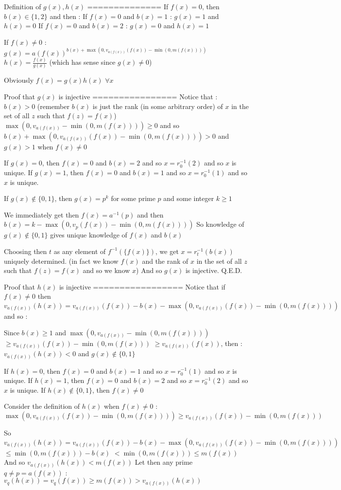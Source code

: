 \begin{solution}
Definition of $g(x),h(x)$
==============
If $f(x)=0$, then $b(x)\in\{1,2\}$ and then :
If $f(x)=0$ and $b(x)=1$ : $g(x)=1$ and $h(x)=0$
If $f(x)=0$ and $b(x)=2$ : $g(x)=0$ and $h(x)=1$

If $f(x)\ne 0$ :
$g(x)=a(f(x))^{b(x)+\max(0,v_{a(f(x))}(f(x))-\min(0,m(f(x))))}$
$h(x)=\frac{f(x)}{g(x)}$ (which has sense since $g(x)\ne 0$)

Obviously $f(x)=g(x)h(x)$ $\forall x$


Proof that $g(x)$ is injective
================
Notice that :
$b(x)>0$ (remember $b(x)$ is just the rank (in some arbitrary order) of $x$ in the set of all $z$ such that $f(z)=f(x)$)
$\max(0,v_{a(f(x))}-\min(0,m(f(x))))\ge 0$ 
and so $b(x)+\max(0,v_{a(f(x))}(f(x))-\min(0,m(f(x))))>0$ and $g(x)>1$ when $f(x)\ne 0$

If $g(x)=0$, then $f(x)=0$ and $b(x)=2$ and so $x=r_0^{-1}(2)$ and so $x$ is unique.
If $g(x)=1$, then $f(x)=0$ and $b(x)=1$ and so $x=r_0^{-1}(1)$ and so $x$ is unique.

If $g(x)\notin\{0,1\}$, then $g(x)=p^k$ for some prime $p$ and some integer $k\ge 1$

We immediately get then $f(x)=a^{-1}(p)$ and then $b(x)=k-\max(0,v_p(f(x))-\min(0,m(f(x))))$
So knowledge of $g(x)\notin\{0,1\}$ gives unique knowledge of $f(x)$ and $b(x)$

Choosing then $t$ as any element of $f^{-1}(\{f(x)\})$, we get $x=r_t^{-1}(b(x))$ uniquely determined.
(in fact we know $f(x)$ and the rank of $x$ in the set of all $z$ such that $f(z)=f(x)$ and so we know $x$)
And so $g(x)$ is injective.
Q.E.D.


Proof that $h(x)$ is injective
=================
Notice that if $f(x)\ne 0$ then $v_{a(f(x))}(h(x))=v_{a(f(x))}(f(x))-b(x)-\max(0,v_{a(f(x))}(f(x))-\min(0,m(f(x))))$ and so :

Since $b(x)\ge 1$ and $\max(0,v_{a(f(x))}-\min(0,m(f(x))))$ $\ge v_{a(f(x))}(f(x))-\min(0,m(f(x)))$ $\ge v_{a(f(x))}(f(x))$, then :
$v_{a(f(x))}(h(x))<0$ and $g(x)\notin\{0,1\}$

If $h(x)=0$, then $f(x)=0$ and $b(x)=1$ and so $x=r_0^{-1}(1)$ and so $x$ is unique.
If $h(x)=1$, then $f(x)=0$ and $b(x)=2$ and so $x=r_0^{-1}(2)$ and so $x$ is unique.
If $h(x)\notin\{0,1\}$, then $f(x)\ne 0$

Consider the definition of $h(x)$ when $f(x)\ne 0$ :
$\max(0,v_{a(f(x))}(f(x))-\min(0,m(f(x))))\ge v_{a(f(x))}(f(x))-\min(0,m(f(x)))$

So $v_{a(f(x))}(h(x))=v_{a(f(x))}(f(x))-b(x)-\max(0,v_{a(f(x))}(f(x))-\min(0,m(f(x))))$ $\le \min(0,m(f(x)))-b(x)$ $<\min(0,m(f(x)))\le m(f(x))$
And so $v_{a(f(x))}(h(x))< m(f(x))$
Let then any prime $q\ne p=a(f(x))$ : $v_q(h(x))=v_q(f(x))\ge m(f(x)) > v_{a(f(x))}(h(x))$


\end{solution}
